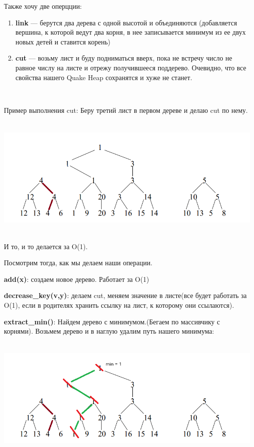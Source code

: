 \documentclass{article}
\begin{document}
Также хочу две оперцции:
\begin{enumerate}
    \item \textbf{link} --- берутся два дерева с одной высотой и объединяются (добавляется вершина, к которой ведут два корня, в нее записывается минимум из ее двух новых детей и ставится корень)
    \item \textbf{cut} --- возьму лист и буду подниматься вверх, пока не встречу число не равное числу на листе и отрежу получившееся поддерево. Очевидно, что все свойства нашего Quake Heap сохранятся и хуже не станет.
\end{enumerate}

\,

Пример выполнения cut: Беру третий лист в первом дереве и делаю cut по нему.

\includegraphics[width=18cm, height=6cm]{7.2.png}

И то, и то делается за O(1). 

Посмотрим тогда, как мы делаем наши операции.

\textbf{add(x)}:  создаем новое дерево. Работает за O(1)

\textbf{decrease\_key(v,y)}: делаем cut, меняем значение в листе(все будет работать за O(1), если в родителях хранить ссылку на лист, к которому они ссылаются).

\textbf{extract\_min()}: Найдем дерево с минимумом.(Бегаем по массивчику с корнями). Возьмем дерево и в наглую удалим путь нашего минимума:

\includegraphics[width=18cm, height=6cm]{7.3.png}
\end{document}
